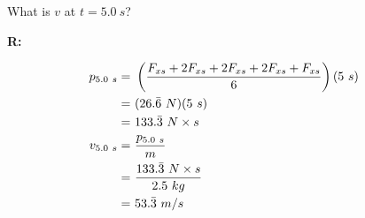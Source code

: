 		What is $v$ at $t = 5.0 \ s$?

		\textbf{R:}

		\begin{align}
			p_{5.0 \ s} = \ &\left(\frac{F_{xs} + 2F_{xs} + 2F_{xs} + 2F_{xs} + F_{xs}}{6}\right)(5 \ s)& \notag \\
			= \ &(26.\bar{6} \ N)(5 \ s)& \notag \\
			= \ &133.\bar{3} \ N \times s& \notag \\
			v_{5.0 \ s} = \ &\frac{p_{5.0 \ s}}{m}& \notag \\
			= \ &\frac{133.\bar{3} \ N \times s}{2.5 \ kg}& \notag \\
			= \ &53.\bar{3} \ m/s&
		\end{align}
